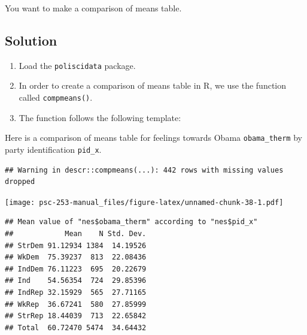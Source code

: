 \documentclass[
]{book}
\newenvironment{Shaded}{\begin{snugshade}}{\end{snugshade}}
\newcommand{\AttributeTok}[1]{\textcolor[rgb]{0.77,0.63,0.00}{#1}}
\newcommand{\CommentTok}[1]{\textcolor[rgb]{0.56,0.35,0.01}{\textit{#1}}}
\newcommand{\FunctionTok}[1]{\textcolor[rgb]{0.00,0.00,0.00}{#1}}
\newcommand{\NormalTok}[1]{#1}
\newcommand{\SpecialCharTok}[1]{\textcolor[rgb]{0.00,0.00,0.00}{#1}}
\providecommand{\tightlist}{%
  \setlength{\itemsep}{0pt}\setlength{\parskip}{0pt}}
\begin{document}
You want to make a comparison of means table.

\hypertarget{solution-14}{%
\subsection{Solution}\label{solution-14}}

\begin{enumerate}
\def\labelenumi{\arabic{enumi}.}
\tightlist
\item
  Load the \texttt{poliscidata} package.
\item
  In order to create a comparison of means table in R, we use the function called \texttt{compmeans()}.\\
\item
  The function follows the following template:
\end{enumerate}

\begin{Shaded}
\end{Shaded}

Here is a comparison of means table for feelings towards Obama \texttt{obama\_therm} by party identification \texttt{pid\_x}.

\begin{Shaded}
\end{Shaded}

\begin{verbatim}
## Warning in descr::compmeans(...): 442 rows with missing values dropped
\end{verbatim}

\texttt{[image: psc-253-manual\_files/figure-latex/unnamed-chunk-38-1.pdf]}

\begin{verbatim}
## Mean value of "nes$obama_therm" according to "nes$pid_x"
##            Mean    N Std. Dev.
## StrDem 91.12934 1384  14.19526
## WkDem  75.39237  813  22.08436
## IndDem 76.11223  695  20.22679
## Ind    54.56354  724  29.85396
## IndRep 32.15929  565  27.71165
## WkRep  36.67241  580  27.85999
## StrRep 18.44039  713  22.65842
## Total  60.72470 5474  34.64432
\end{verbatim}
\end{document}

